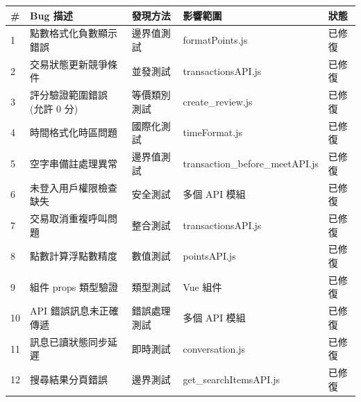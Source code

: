\documentclass[11pt, a4paper]{article}
\begin{document}
\begin{center}
  \scriptsize
  \renewcommand{\arraystretch}{1.3}
  \begin{longtable}{p{} p{} p{} p{} p{}}
    \toprule
    \textbf{\#}             & \textbf{Bug 描述}   & \textbf{發現方法} & \textbf{影響範圍}                   & \textbf{狀態}                   \\
    \midrule
    1                       & 點數格式化負數顯示錯誤       & 邊界值測試         & formatPoints.js                 & \textcolor{SuccessGreen}{已修復} \\
    \rowcolor{LightGray} 2  & 交易狀態更新競爭條件        & 並發測試          & transactionsAPI.js              & \textcolor{SuccessGreen}{已修復} \\
    3                       & 評分驗證範圍錯誤 (允許 0 分) & 等價類別測試        & create\_review.js               & \textcolor{SuccessGreen}{已修復} \\
    \rowcolor{LightGray} 4  & 時間格式化時區問題         & 國際化測試         & timeFormat.js                   & \textcolor{SuccessGreen}{已修復} \\
    5                       & 空字串備註處理異常         & 邊界值測試         & transaction\_before\_meetAPI.js & \textcolor{SuccessGreen}{已修復} \\
    \rowcolor{LightGray} 6  & 未登入用戶權限檢查缺失       & 安全測試          & 多個 API 模組                       & \textcolor{SuccessGreen}{已修復} \\
    7                       & 交易取消重複呼叫問題        & 整合測試          & transactionsAPI.js              & \textcolor{SuccessGreen}{已修復} \\
    \rowcolor{LightGray} 8  & 點數計算浮點數精度         & 數值測試          & pointsAPI.js                    & \textcolor{SuccessGreen}{已修復} \\
    9                       & 組件 props 類型驗證     & 類型測試          & Vue 組件                          & \textcolor{SuccessGreen}{已修復} \\
    \rowcolor{LightGray} 10 & API 錯誤訊息未正確傳遞     & 錯誤處理測試        & 多個 API 模組                       & \textcolor{SuccessGreen}{已修復} \\
    11                      & 訊息已讀狀態同步延遲        & 即時測試          & conversation.js                 & \textcolor{SuccessGreen}{已修復} \\
    \rowcolor{LightGray} 12 & 搜尋結果分頁錯誤          & 邊界測試          & get\_searchItemsAPI.js          & \textcolor{SuccessGreen}{已修復} \\
    \bottomrule
  \end{longtable}
\end{center}
\end{document}
